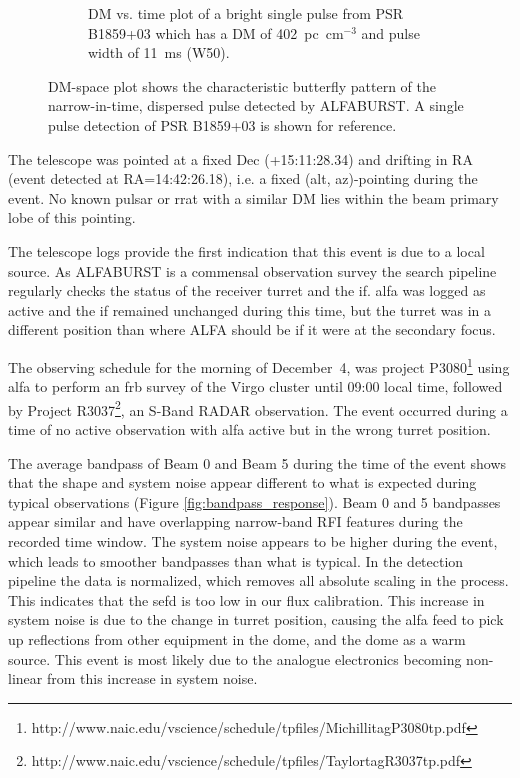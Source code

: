 \documentclass[a4paper,fleqn,usenatbib]{mnras}
\begin{document}
\begin{figure}
\begin{subfigure}[t]{0.5\textwidth}
        \caption{DM vs. time plot of a bright single pulse from PSR B1859+03
        which has a DM of 402~pc~cm$^{-3}$ and pulse width of 11~ms (W50).
        }
        \label{fig:dm_time_B1859}
    \end{subfigure}
    \caption{DM-space plot shows the characteristic butterfly pattern of the
    narrow-in-time, dispersed pulse detected by ALFABURST. A single pulse
    detection of PSR B1859+03 is shown for reference.
    }
    \label{fig:dm_time}
\end{figure}

The telescope was pointed at a fixed Dec (+15:11:28.34) and drifting in RA
(event detected at RA=14:42:26.18), i.e. a fixed (alt, az)-pointing during the
event. No known pulsar or \gls{rrat} with a similar DM lies within the beam
primary lobe of this pointing.

The telescope logs provide the first indication that this event is due to a
local source. As ALFABURST is a commensal observation survey the search pipeline
regularly checks the status of the receiver turret and the \gls{if}. \gls{alfa}
was logged as active and the \gls{if} remained unchanged during this time, but
the turret was in a different position than where ALFA should be if it were at
the secondary focus.

The observing schedule for the morning of December~4, was project
P3080\footnote{http://www.naic.edu/vscience/schedule/tpfiles/MichillitagP3080tp.pdf}
using \gls{alfa} to perform an \gls{frb} survey of the Virgo cluster until 09:00
local time, followed by Project
R3037\footnote{http://www.naic.edu/vscience/schedule/tpfiles/TaylortagR3037tp.pdf},
an S-Band RADAR observation.  The event occurred during a time of no active
observation with \gls{alfa} active but in the wrong turret position.

The average bandpass of Beam 0 and Beam 5 during the time of the event shows
that the shape and system noise appear different to what is expected during
typical observations (Figure \ref{fig:bandpass_response}).  Beam 0 and 5
bandpasses appear similar and have overlapping narrow-band RFI features during
the recorded time window.  The system noise appears to be higher during the
event, which leads to smoother bandpasses than what is typical.  In the
detection pipeline the data is normalized, which removes all absolute scaling in
the process. This indicates that the \gls{sefd} is too low in our flux
calibration.  This increase in system noise is due to the change in turret
position, causing the \gls{alfa} feed to pick up reflections from other
equipment in the dome, and the dome as a warm source.  This event is most likely
due to the analogue electronics becoming non-linear from this increase in system
noise.
\end{document}
